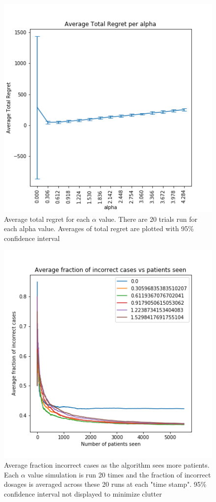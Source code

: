 \documentclass{article}
\begin{document}
\begin{figure}
	\includegraphics[width=\linewidth]{../plots/avg_tot_regret_alpha.png}
	\caption{Average total regret for each $\alpha$ value. There are 20 trials run for each alpha value. Averages of total regret are plotted with 95\% confidence interval}
	\label{fig:avg_tot_regret_alpha}
\end{figure}

\begin{figure}
	\includegraphics[width=\linewidth]{../plots/avg_frac_alphas.png}
	\caption{Average fraction incorrect cases as the algorithm sees more patients. Each $\alpha$ value simulation is run 20 times and the fraction of incorrect dosages is averaged across these 20 runs at each "time stamp". 95\% confidence interval not displayed to minimize clutter}
	\label{fig:avg_frac_alphas}
\end{figure}
\end{document}
